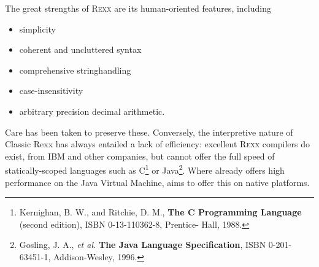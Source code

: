 
The great strengths of R\textsc{exx} are its human-oriented features, including
\begin{itemize}
\item simplicity
\item coherent and uncluttered syntax
\item comprehensive stringhandling
\item case-insensitivity
\item arbitrary precision decimal arithmetic.
\end{itemize}
Care has been taken to preserve these. Conversely, the interpretive
nature of Classic Rexx has always entailed a lack of efficiency: excellent R\textsc{exx}
compilers do exist, from IBM and other companies, but cannot offer the
full speed of statically-scoped languages such as
C\footnote{Kernighan, B. W., and Ritchie, D. M., \textbf{The C
    Programming Language} (second edition), ISBN 0-13-110362-8,
  Prentice- Hall, 1988.} or Java\footnote{Gosling, J. A., \emph{et
    al.} \textbf{The Java Language Specification}, ISBN 0-201-63451-1,
  Addison-Wesley, 1996.}. Where \nr{} already offers high performance
on the Java Virtual Machine, \crexx{} aims to offer this on native platforms.


